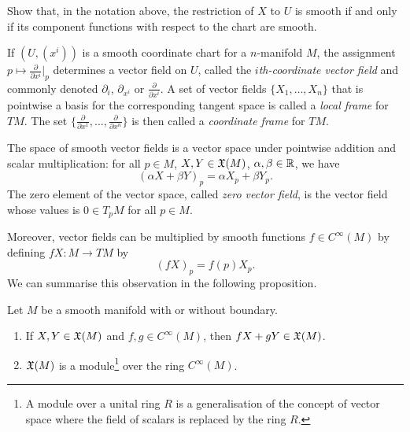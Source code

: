 \begin{exercise}
	Show that, in the notation above, the restriction of $X$ to $U$ is smooth if and only if its component functions with respect to the chart are smooth.
\end{exercise}

\begin{example}
	If $(U, (x^i))$ is a smooth coordinate chart for a $n$-manifold $M$, the assignment $p \mapsto \frac{\partial}{\partial x^i}\big|_p$ determines a vector field on $U$, called the \emph{$i$th-coordinate vector field} and commonly denoted $\partial_{i}$, $\partial_{x^i}$ or $\frac{\partial}{\partial x^i}$.
	A set of vector fields $\{X_1, \ldots, X_n\}$ that is pointwise a basis for the corresponding tangent space is called a \emph{local frame} for $TM$.
	The set $\{\frac{\partial}{\partial x^1}, \ldots, \frac{\partial}{\partial x^n}\}$ is then called a \emph{coordinate frame} for $TM$.
\end{example}

The space of smooth vector fields is a vector space under pointwise addition and scalar multiplication: for all $p\in M$, $X,Y\in\mathfrak{X}(M)$, $\alpha, \beta \in \mathbb{R}$, we have
\begin{equation}
	(\alpha X + \beta Y)_p = \alpha X_p + \beta Y_p.
\end{equation}
The zero element of the vector space, called \emph{zero vector field}, is the vector field whose values is $0\in T_pM$ for all $p\in M$.

Moreover, vector fields can be multiplied by smooth functions $f\in C^\infty(M)$ by defining $fX:M\to  TM$ by
\begin{equation}
	(fX)_p = f(p)X_p.
\end{equation}
We can summarise this observation in the following proposition.

\begin{proposition}
	Let $M$ be a smooth manifold with or without boundary.
	\begin{enumerate}
		\item If $X,Y \in \mathfrak{X}(M)$ and $f,g\in C^\infty(M)$, then $fX+gY \in\mathfrak{X}(M)$.
		\item $\mathfrak{X}(M)$ is a module\footnote{A module over a unital ring $R$ is a generalisation of the concept of vector space where the field of scalars is replaced by the ring $R$.} over the ring $C^\infty(M)$.
	\end{enumerate}
\end{proposition}

